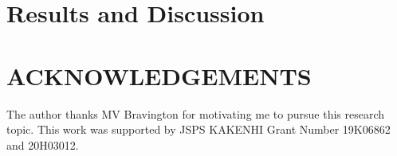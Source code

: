 \documentclass[AMA,STIX1COL]{WileyNJD-v2}
\begin{document}
\begin{comment}
今回新たに開発した移動に関する関係式について、以下の６種類の親魚に関するその子供（当歳魚）ペアがありえる：
\begin{enumerate}
  \item $N_1(t)\to N_2(t+1)$
  \item $N_1(t)\to N_2(t+2)$
  \item $N_1(t+1)\to N_2(t+2)$
  \item $N_2(t)\to N_1(t+1)$
  \item $N_2(t)\to N_1(t+2)$
  \item $N_2(t+1)\to N_1(t+2)$
\end{enumerate}
右向きの矢印$\to$は、興味ある親魚が年を跨いだ後どのサブ集団に属しているかを表している。１番目を例にとると、$t$年にサブ集団１から、$t+1$年にサブ集団２からそれぞれ当歳魚をサンプルすることを意味する。加えて、同じサブ集団から年を跨いで見つかる半兄弟ペアに基づく関係式についても、以下の６種類が考えられる：
\begin{enumerate}
\setcounter{enumi}{6}
  \item $N_1(t)\to N_1(t+1)$
  \item $N_1(t)\to N_1(t+2)$
  \item $N_1(t+1)\to N_1(t+2)$
  \item $N_2(t)\to N_2(t+1)$
  \item $N_2(t)\to N_2(t+2)$
  \item $N_2(t+1)\to N_2(t+2)$
\end{enumerate}
以上の、合計１２種類の式を連立できることを示した。最大１４個のパラメータが必要となるのであったが、パラメータ数を応用先に応じて適宜減少させることができる場合、興味あるパラメータを推定することができる。

ちなみに、同一年内に同じサブ集団内で見つかるMHSペアについては、有効集団サイズの情報（正確には有効繁殖サイズ、Effective breeding size）は持っているが、センサスサイズに関するダイレクトな情報は持っていない点に注意。
\end{comment}%

\section{Results and Discussion}\label{sec4}


\section{ACKNOWLEDGEMENTS} 

The author thanks MV Bravington for motivating me to pursue this research topic. This work was supported by JSPS KAKENHI Grant Number 19K06862 and 20H03012.
\end{document}
